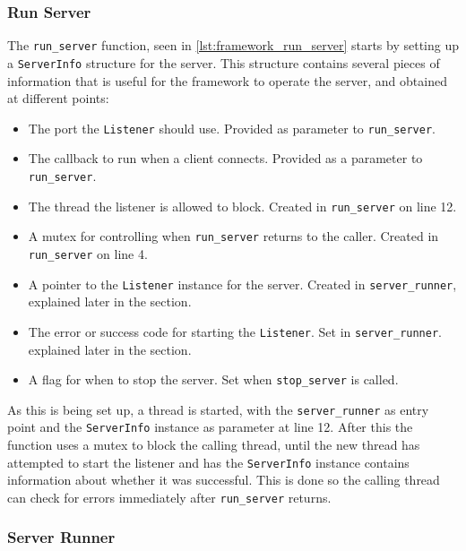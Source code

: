 \subsubsection{Run Server}
The \lstinline|run_server| function, seen in \autoref{lst:framework_run_server} starts by setting up a \lstinline|ServerInfo| structure for the server. This structure contains several
pieces of information that is useful for the framework to operate the server, and obtained at different points:
\begin{itemize}
\item The port the \lstinline|Listener| should use. Provided as parameter to \lstinline|run_server|.
\item The callback to run when a client connects. Provided as a parameter to \lstinline|run_server|.
\item The thread the listener is allowed to block. Created in \lstinline|run_server| on line 12.
\item A mutex for controlling when \lstinline|run_server| returns to the caller. Created in \lstinline|run_server| on line 4.
\item A pointer to the \lstinline|Listener| instance for the server. Created in \lstinline|server_runner|, explained later in the section.
\item The error or success code for starting the \lstinline|Listener|. Set in \lstinline|server_runner|. explained later in the section.
\item A flag for when to stop the server. Set when \lstinline|stop_server| is called.
\end{itemize}
As this is being set up, a thread is started, with the \lstinline|server_runner| as entry point and the \lstinline|ServerInfo| instance as parameter at line 12. After this the function uses a mutex
to block the calling thread, until the new thread has attempted to start the listener and has the \lstinline|ServerInfo| instance contains information about whether it was successful.
This is done so the calling thread can check for errors immediately after \lstinline|run_server| returns.


\subsubsection{Server Runner}
